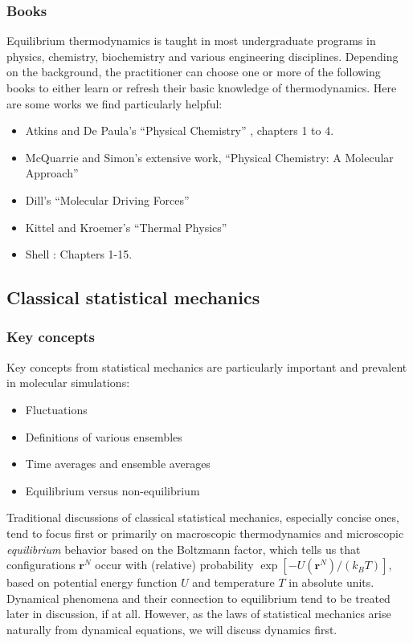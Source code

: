 \documentclass[9pt,bestpractices]{livecoms}
\newcommand{\conf}{\mathbf{r}^N}
\begin{document}
\subsubsection{Books}
Equilibrium thermodynamics is taught in most undergraduate programs in physics, chemistry, biochemistry and various engineering disciplines.
Depending on the background, the practitioner can choose one or more of the following books to either learn or refresh their basic knowledge of thermodynamics.
Here are some works we find particularly helpful:
\begin{itemize}
\item Atkins and De Paula's ``Physical Chemistry'' \cite{AtkinsBook}, chapters 1 to 4.
\item McQuarrie and Simon's extensive work, ``Physical Chemistry: A Molecular Approach''~\cite{McQuarrie:1997:}
\item Dill's ``Molecular Driving Forces''~\cite{DillBook}
\item Kittel and Kroemer's ``Thermal Physics''~\cite{Kittel:1980:}
\item Shell \cite{ShellBook}: Chapters 1-15.
\end{itemize}


\subsection{Classical statistical mechanics}
\label{sec:stat_mech}
\subsubsection{Key concepts}
Key concepts from statistical mechanics are particularly important and prevalent in molecular simulations:
\begin{itemize}
\item Fluctuations
\item Definitions of various ensembles
\item Time averages and ensemble averages
\item Equilibrium versus non-equilibrium
\end{itemize}

Traditional discussions of classical statistical mechanics, especially concise ones, tend to focus first or primarily on macroscopic thermodynamics and microscopic \emph{equilibrium} behavior based on the Boltzmann factor, which tells us that configurations $\conf$ occur with (relative) probability $\exp[-U(\conf)/(k_B T)]$, based on potential energy function $U$ and temperature $T$ in absolute units.
Dynamical phenomena and their connection to equilibrium tend to be treated later in discussion, if at all.
However, as the laws of statistical mechanics arise naturally from dynamical equations, we will discuss dynamics first.
\end{document}
